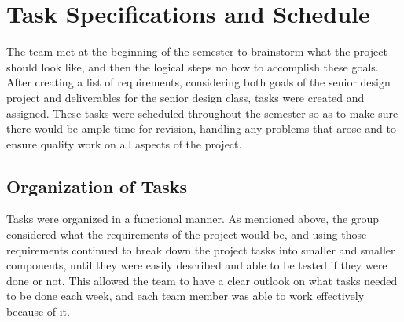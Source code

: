 \documentclass[PPFS.tex]{template/subfiles}
\begin{document}
\begin{comment}
These are the requirements as stated in the template given by Profess M.

    Detailed task specifications are a key part of your design.  Tasks that take more than a day or two should be broken down into sub-tasks whenever possible.  Typically tasks specs and schedule are combined since they are intimately related.  The percentage complete on each task should be included in the PPFS.  Address any issues related to tasks that are behind schedule in the project management section.  Organize tasks hierarchically, such as system architecture, mechanical, electrical (hardware, software), etc.  Provide block diagrams to help explain how you divided the project into various phases/parts/categories.  
    Many teams make the mistake of thinking the prototype is the design.  This is rarely the case.  Only a few teams produce a single device.  Most are designing a product that can be mass produced.  Thus the prototype is your method of validating your production design.   It is a major test or validation activity on the way to completing the design.  Include prototyping activities as tasks that help you finish the production design.  
    Summarize your schedule by reporting the total expected person-hours needed to complete the design.  The best reports track the schedule progress by reporting the month by month estimate of total person-hours and graphing how it changed as you gained experience.
\end{comment}

\section{Task Specifications and Schedule}
The team met at the beginning of the semester to brainstorm what the project should look like, and then the logical steps no how to accomplish these goals. After creating a list of requirements, considering both goals of the senior design project and deliverables for the senior design class, tasks were created and assigned. These tasks were scheduled throughout the semester so as to make sure there would be ample time for revision, handling any problems that arose and to ensure quality work on all aspects of the project.

\subsection{Organization of Tasks}
Tasks were organized in a functional manner. As mentioned above, the group considered what the requirements of the project would be, and using those requirements continued to break down the project tasks into smaller and smaller components, until they were easily described and able to be tested if they were done or not. This allowed the team to have a clear outlook on what tasks needed to be done each week, and each team member was able to work effectively because of it. 
\end{document}
